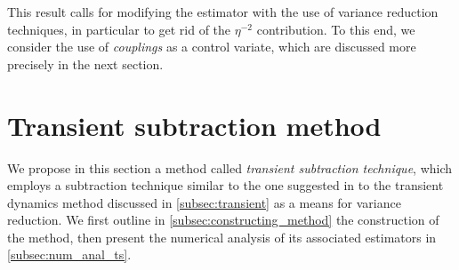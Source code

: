 \documentclass[11pt]{article}
\theoremstyle{definition}
\begin{document}
This result calls for modifying the estimator with the use of variance reduction techniques, in particular to get rid of the $\eta^{-2}$ contribution. To this end, we consider the use of \emph{couplings} as a control variate, which are discussed more precisely in the next section. 

\section{Transient subtraction method}
\label{sec:transient}
We propose in this section a method called \emph{transient subtraction technique}, which employs a subtraction technique similar to the one suggested in \cite{ciccotti1975} to the transient dynamics method discussed in \cref{subsec:transient} as a means for variance reduction. We first outline in \cref{subsec:constructing_method} the construction of the method, then present the numerical analysis of its associated estimators in \cref{subsec:num_anal_ts}.
\end{document}
